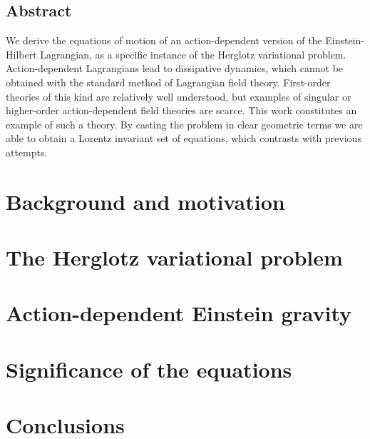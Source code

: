 \documentclass[12pt, oneside]{book}
\begin{document}
\vfill
\hspace{0pt}

\pagebreak
\section*{Abstract}
We derive the equations of motion of an action-dependent version of the Einstein-Hilbert Lagrangian, as a specific instance of the Herglotz variational problem. Action-dependent Lagrangians lead to dissipative dynamics, which cannot be obtained with the standard method of Lagrangian field theory. First-order theories of this kind are relatively well understood, but examples of singular or higher-order action-dependent field theories are scarce. This work constitutes an example of such a theory. By casting the problem in clear geometric terms we are able to obtain a Lorentz invariant set of equations, which contrasts with previous attempts. 


	{\small \sffamily \tableofcontents}

\mainmatter
\pagestyle{main}

\chapter{Background and motivation}


\chapter{The Herglotz variational problem}\label{ch:herglotz}


\chapter{Action-dependent Einstein gravity}\label{ch:einstein}


\chapter{Significance of the equations}\label{ch:significance}


\chapter{Conclusions}\label{ch:conclusions}


\backmatter

\pagestyle{plain}
\printbibliography
\end{document}
